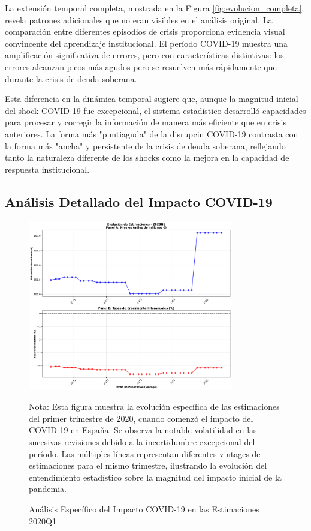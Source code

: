 \documentclass[12pt,a4paper]{article}
\begin{document}
La extensión temporal completa, mostrada en la Figura \ref{fig:evolucion_completa}, revela patrones adicionales que no eran visibles en el análisis original. La comparación entre diferentes episodios de crisis proporciona evidencia visual convincente del aprendizaje institucional. El período COVID-19 muestra una amplificación significativa de errores, pero con características distintivas: los errores alcanzan picos más agudos pero se resuelven más rápidamente que durante la crisis de deuda soberana.

Esta diferencia en la dinámica temporal sugiere que, aunque la magnitud inicial del shock COVID-19 fue excepcional, el sistema estadístico desarrolló capacidades para procesar y corregir la información de manera más eficiente que en crisis anteriores. La forma más "puntiaguda" de la disrupcin COVID-19 contrasta con la forma más "ancha" y persistente de la crisis de deuda soberana, reflejando tanto la naturaleza diferente de los shocks como la mejora en la capacidad de respuesta institucional.

\subsection{Análisis Detallado del Impacto COVID-19}

\begin{figure}[h]
\centering
\includegraphics[width=0.8\textwidth]{../figuras/evolucion_estimaciones_2020Q1_robusto.png}
\caption{Análisis Específico del Impacto COVID-19 en las Estimaciones 2020Q1}
\label{fig:covid_impact}
\begin{flushleft}
\footnotesize
Nota: Esta figura muestra la evolución específica de las estimaciones del primer trimestre de 2020, cuando comenzó el impacto del COVID-19 en España. Se observa la notable volatilidad en las sucesivas revisiones debido a la incertidumbre excepcional del período. Las múltiples líneas representan diferentes vintages de estimaciones para el mismo trimestre, ilustrando la evolución del entendimiento estadístico sobre la magnitud del impacto inicial de la pandemia.
\end{flushleft}
\end{figure}
\end{document}
